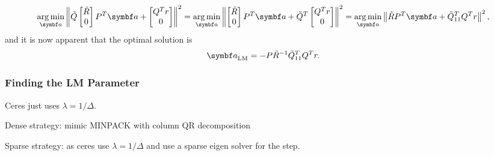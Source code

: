 \begin{equation*}
  \argmin_{\a} \left\| \tilde Q \begin{bmatrix} \tilde R \\ 0 \end{bmatrix} P^{T} \a + \begin{bmatrix} Q^{T} r \\ 0 \end{bmatrix} \right\|^2 =
  \argmin_{\a} \left\| \begin{bmatrix} \tilde R \\ 0 \end{bmatrix} P^{T} \a + \tilde Q^{T} \begin{bmatrix} Q^{T} r \\ 0 \end{bmatrix} \right\|^2 = \argmin_{\a} \left\| \tilde R P^{T} \a + \tilde Q_{11}^{T} Q^{T} r \right\|^{2},
\end{equation*}
and it is now apparent that the optimal solution is
\begin{equation}
  \label{eq:5}
  \a_{\textrm{LM}} = - P \tilde R^{-1} \tilde Q_{11}^{T} Q^{T} r.
\end{equation}


\subsubsection{Finding the LM Parameter}


\begin{remark}
  Ceres just uses $\lambda = 1 / \Delta$.

  Dense strategy: mimic MINPACK with column QR decomposition

  Sparse strategy: as ceres use $\lambda = 1 / \Delta$ and use a sparse eigen solver for the step.
\end{remark}


